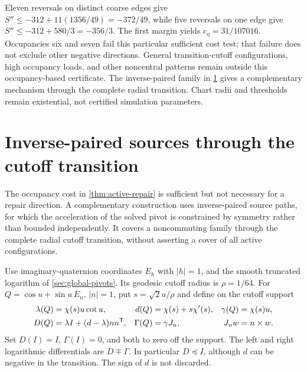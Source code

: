 \documentclass[11pt,oneside,openany]{book}
\theoremstyle{definition}
\theoremstyle{remark}
\begin{document}
Eleven reversals on distinct coarse edges give
$S''\le-312+11(1356/49)=-372/49$, while five reversals on one edge
give $S''\le-312+580/3=-356/3$. The first margin yields
$c_\eta=31/107016$. Occupancies six and seven fail this particular
sufficient cost test; that failure does not exclude other negative
directions. General transition-cutoff configurations, high occupancy
loads, and other noncentral patterns remain outside this occupancy-based
certificate. The inverse-paired family in
\cref{sec:paired-transition-repair} gives a complementary mechanism
through the complete radial transition. Chart radii and thresholds
remain existential, not certified simulation parameters.

\section{Inverse-paired sources through the cutoff transition}
\label{sec:paired-transition-repair}
The occupancy cost in \cref{thm:active-repair} is sufficient but not
necessary for a repair direction. A complementary construction uses
inverse-paired source paths, for which the acceleration of the solved
pivot is constrained by symmetry rather than bounded independently.
It covers a noncommuting family through the complete radial cutoff
transition, without asserting a cover of all active configurations.

Use imaginary-quaternion coordinates $E_h$ with $|h|=1$, and the
smooth truncated logarithm of \cref{sec:global-pivots}. Its geodesic
cutoff radius is $\rho=1/64$. For
$Q=\cos u+\sin u\,E_n$, $|n|=1$, put
$s=\sqrt2u/\rho$ and define on the cutoff support
\begin{align}
 \lambda(Q)&=\chi(s)u\cot u,&
 d(Q)&=\chi(s)+s\chi'(s),&
 \gamma(Q)&=\chi(s)u,\notag\\
 D(Q)&=\lambda I+(d-\lambda)nn^{\mathsf T},&
 \Gamma(Q)&=\gamma J_n,& J_nw&=n\times w.
 \label{eq:paired-log-differential}
\end{align}
Set $D(I)=I$, $\Gamma(I)=0$, and both to zero off the support.
The left and right logarithmic differentials are $D\mp\Gamma$.
In particular $D\preceq I$, although $d$ can be negative in the
transition. The sign of $d$ is not discarded.
\end{document}
